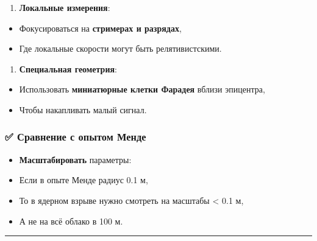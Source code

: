 \documentclass[11pt]{article}
\providecommand{\tightlist}{%
      \setlength{\itemsep}{0pt}\setlength{\parskip}{0pt}}
\begin{document}
\begin{enumerate}
\def\labelenumi{\arabic{enumi}.}
\setcounter{enumi}{1}
\tightlist
\item
  \textbf{Локальные измерения}:\\
\end{enumerate}

\begin{itemize}
\tightlist
\item
  Фокусироваться на \textbf{стримерах и разрядах},\\
\item
  Где локальные скорости могут быть релятивистскими.
\end{itemize}

\begin{enumerate}
\def\labelenumi{\arabic{enumi}.}
\setcounter{enumi}{2}
\tightlist
\item
  \textbf{Специальная геометрия}:\\
\end{enumerate}

\begin{itemize}
\tightlist
\item
  Использовать \textbf{миниатюрные клетки Фарадея} вблизи эпицентра,\\
\item
  Чтобы накапливать малый сигнал.
\end{itemize}

\subsubsection{✅ Сравнение с опытом
Менде}\label{ux441ux440ux430ux432ux43dux435ux43dux438ux435-ux441-ux43eux43fux44bux442ux43eux43c-ux43cux435ux43dux434ux435}

\begin{itemize}
\tightlist
\item
  \textbf{Масштабировать} параметры:\\
\item
  Если в опыте Менде радиус 0.1 м,\\
\item
  То в ядерном взрыве нужно смотреть на масштабы \textless{} 0.1 м,\\
\item
  А не на всё облако в 100 м.
\end{itemize}

\begin{center}\rule{0.5\linewidth}{\linethickness}\end{center}
\end{document}

